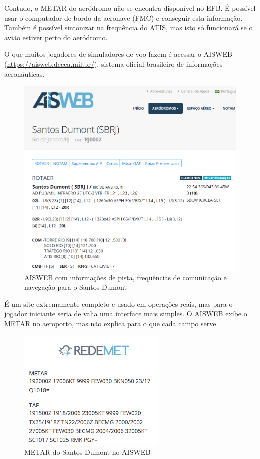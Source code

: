 Contudo, o METAR do aeródromo não se encontra disponível no EFB. É possível usar
 o computador de bordo da aeronave (FMC) e conseguir esta informação. Também é 
 possível sintonizar na frequência do ATIS, mas isto só funcionará se o avião
 estiver perto do aeródromo.

O que muitos jogadores de simuladores de voo fazem é acessar o AISWEB 
(\url{https://aisweb.decea.mil.br/}), sistema oficial brasileiro de informações
aeronáuticas. 

\begin{figure}[ht]
    \begin{center}
    \includegraphics[width=400pt]{img/aisweb.png}
    \caption{AISWEB com informações de pista, frequências de comunicação e navegação para o Santos Dumont}
    \label{fig:aisweb}
    \end{center}
\end{figure}

É um site extremamente completo e usado em operações reais, mas para o jogador 
iniciante seria de valia uma interface mais simples. O AISWEB exibe o METAR no 
aeroporto, mas não explica para o que cada campo serve.

\begin{figure}[ht]
    \begin{center}
    \includegraphics[width=200pt]{img/metar-aisweb.png}
    \caption{METAR do Santos Dumont no AISWEB}
    \label{fig:aisweb}
    \end{center}
\end{figure}

